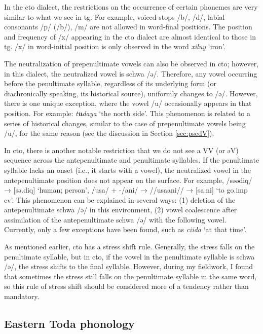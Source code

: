 In the \acl{cto} dialect, the restrictions on the occurrence of certain phonemes are very similar to what we see in \acl{tg}. For example, voiced stops /b/, /d/, labial consonants /p/ (/b/), /m/ are not allowed in word-final positions. The position and frequency of /x/ appearing in the \acl{cto} dialect are almost identical to those in \acl{tg}. /x/ in word-initial position is only observed in the word \textit{xiluy} `iron'.

The neutralization of prepenultimate vowels can also be observed in \acl{cto}; however, in this dialect, the neutralized vowel is schwa /ə/. Therefore, any vowel occurring before the penultimate syllable, regardless of its underlying form (or diachronically speaking, its historical source), uniformly changes to /ə/. However, there is one unique exception, where the vowel /u/ occasionally appears in that position. For example: \textit{t\textbf{u}daya} `the north side'. This phenomenon is related to a series of historical changes, similar to the case of prepenultimate vowels being /u/, for the same reason (see the discussion in Section \ref{sec:psedV}).

In \acl{cto}, there is another notable restriction that we do not see a VV (or əV) sequence across the antepenultimate and penultimate syllables. If the penultimate syllable lacks an onset (i.e., it starts with a vowel), the neutralized vowel in the antepenultimate position does not appear on the surface. For example, /səədiq/ → [sə.diq] `human; person', /usa/ + -/ani/ → //usaani// → [sa.ni] `to go.\acs{imp} \acs{cv}'. This phenomenon can be explained in several ways: (1) deletion of the antepenultimate schwa /ə/ in this environment, (2) vowel coalescence after assimilation of the antepenultimate schwa /ə/ with the following vowel. Currently, only a few exceptions have been found, such as \textit{ciida} `at that time'.

As mentioned earlier, \acl{cto} has a stress shift rule. Generally, the stress falls on the penultimate syllable, but in \acl{cto}, if the vowel in the penultimate syllable is schwa /ə/, the stress shifts to the final syllable. However, during my fieldwork, I found that sometimes the stress still falls on the penultimate syllable in the same word, so this rule of stress shift should be considered more of a tendency rather than mandatory.

\subsection{Eastern Toda phonology}

